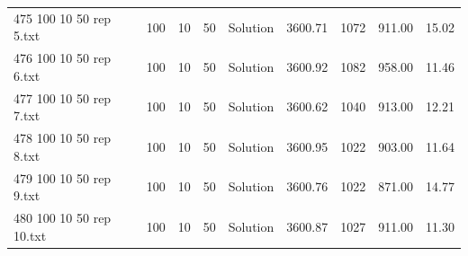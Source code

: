\begin{longtable}{lrrllrrrr}
475 100 10 50 rep 5.txt & 100 & 10 & 50 & Solution & 3600.71 & 1072 & 911.00 & 15.02\\
476 100 10 50 rep 6.txt & 100 & 10 & 50 & Solution & 3600.92 & 1082 & 958.00 & 11.46\\
477 100 10 50 rep 7.txt & 100 & 10 & 50 & Solution & 3600.62 & 1040 & 913.00 & 12.21\\
478 100 10 50 rep 8.txt & 100 & 10 & 50 & Solution & 3600.95 & 1022 & 903.00 & 11.64\\
479 100 10 50 rep 9.txt & 100 & 10 & 50 & Solution & 3600.76 & 1022 & 871.00 & 14.77\\
480 100 10 50 rep 10.txt & 100 & 10 & 50 & Solution & 3600.87 & 1027 & 911.00 & 11.30\\
\end{longtable}


